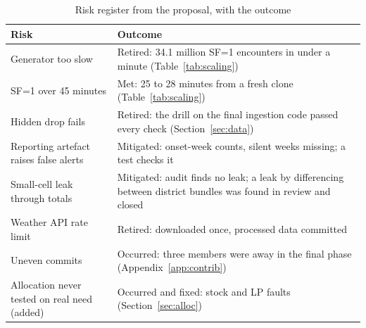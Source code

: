 \begin{table}[htbp]
\caption{Risk register from the proposal, with the outcome}
\label{tab:risks}
\centering\footnotesize
\setlength{\tabcolsep}{3pt}
\begin{tabular}{@{}>{\raggedright\arraybackslash}p{2.6cm}>{\raggedright\arraybackslash}p{5.1cm}@{}}
\toprule
Risk & Outcome \\
\midrule
Generator too slow & Retired: 34.1 million SF=1 encounters in under a minute (Table~\ref{tab:scaling}) \\
SF=1 over 45 minutes & Met: 25 to 28 minutes from a fresh clone (Table~\ref{tab:scaling}) \\
Hidden drop fails & Retired: the drill on the final ingestion code passed every check (Section~\ref{sec:data}) \\
Reporting artefact raises false alerts & Mitigated: onset-week counts, silent weeks missing; a test checks it \\
Small-cell leak through totals & Mitigated: audit finds no leak; a leak by differencing between district
bundles was found in review and closed \\
Weather API rate limit & Retired: downloaded once, processed data committed \\
Uneven commits & Occurred: three members were away in the final phase (Appendix~\ref{app:contrib}) \\
Allocation never tested on real need (added) & Occurred and fixed: stock and LP faults (Section~\ref{sec:alloc}) \\
\bottomrule
\end{tabular}
\end{table}
